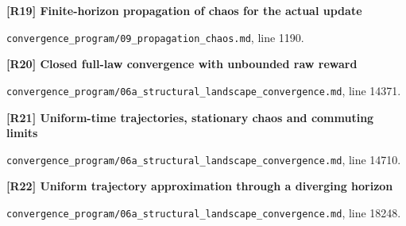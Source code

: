 \documentclass[11pt,a4paper]{article}
\begin{document}
\par\medskip\noindent\begin{minipage}{\linewidth}\textbf{[R19] Finite-horizon propagation of chaos for the actual update}\label{src:thm-chaos-finite-time-consistency}\par
{\small\texttt{}\par
\nolinkurl{convergence_program/09_propagation_chaos.md}, line 1190.\par}
\end{minipage}\par

\par\medskip\noindent\begin{minipage}{\linewidth}\textbf{[R20] Closed full-law convergence with unbounded raw reward}\label{src:thm-slcw-active-contraction}\par
{\small\texttt{}\par
\nolinkurl{convergence_program/06a_structural_landscape_convergence.md}, line 14371.\par}
\end{minipage}\par

\par\medskip\noindent\begin{minipage}{\linewidth}\textbf{[R21] Uniform-time trajectories, stationary chaos and commuting limits}\label{src:cor-slcw-trajectories}\par
{\small\texttt{}\par
\nolinkurl{convergence_program/06a_structural_landscape_convergence.md}, line 14710.\par}
\end{minipage}\par

\par\medskip\noindent\begin{minipage}{\linewidth}\textbf{[R22] Uniform trajectory approximation through a diverging horizon}\label{src:thm-slcgt-growing-trajectory}\par
{\small\texttt{}\par
\nolinkurl{convergence_program/06a_structural_landscape_convergence.md}, line 18248.\par}
\end{minipage}\par
\end{document}
